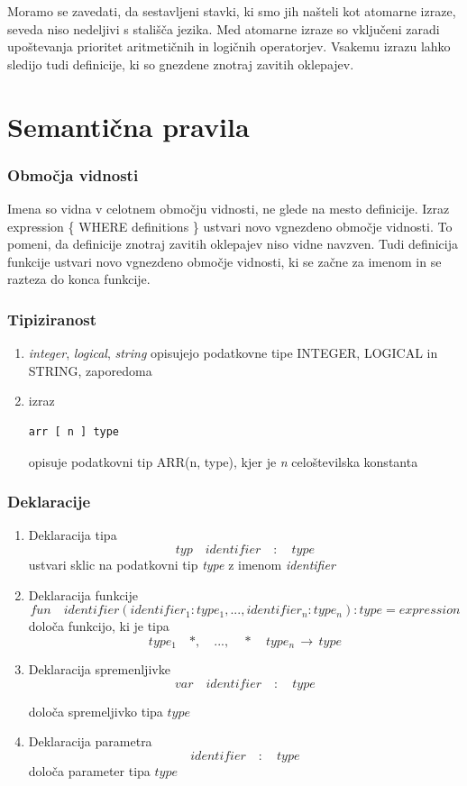 \documentclass[a4paper, 12p]{book}
\begin{document}
Moramo se zavedati, da sestavljeni stavki, ki smo jih našteli kot atomarne izraze, seveda niso nedeljivi s stališča jezika. Med atomarne izraze so vključeni zaradi upoštevanja prioritet aritmetičnih in logičnih operatorjev. Vsakemu izrazu lahko sledijo tudi definicije, ki so gnezdene znotraj zavitih oklepajev.

\section{Semantična pravila}

\subsubsection{Območja vidnosti}

Imena so vidna v celotnem območju vidnosti, ne glede na mesto definicije. Izraz {\ttfamily expression \{ WHERE definitions \}} ustvari novo vgnezdeno območje vidnosti. To pomeni, da definicije znotraj zavitih oklepajev niso vidne navzven. Tudi definicija funkcije ustvari novo vgnezdeno območje vidnosti, ki se začne za imenom in se razteza do konca funkcije.

\subsubsection{Tipiziranost}

\begin{enumerate}
	\item \textit{integer}, \textit{logical}, \textit{string} opisujejo podatkovne tipe INTEGER, LOGICAL in STRING, zaporedoma
	\item izraz 
\begin{lstlisting}[]
	arr [ n ] type
\end{lstlisting}
	opisuje podatkovni tip ARR(n, type), kjer je \textit{n} celoštevilska konstanta 
\end{enumerate}

\subsubsection{Deklaracije}

\begin{enumerate}
	\item Deklaracija tipa
\[
typ\quad  identifier\quad  :\quad  type
\]
	ustvari sklic na podatkovni tip \textit{type} z imenom \textit{identifier}
	\item Deklaracija funkcije
\[ fun\quad identifier  ( identifier_1 : type_1, ..., identifier_n : type_n ) : type = expression \]
	določa funkcijo, ki je tipa \[type_1 \quad *, \quad  ..., \quad *\quad  type_n \,\to\, type \]
	\item Deklaracija spremenljivke
\[
var \quad identifier\quad :\quad type
\]

določa spremeljivko tipa $type$
	\item Deklaracija parametra
\[
identifier \quad :\quad type
\]
določa parameter tipa $type$
\end{enumerate}
\end{document}
